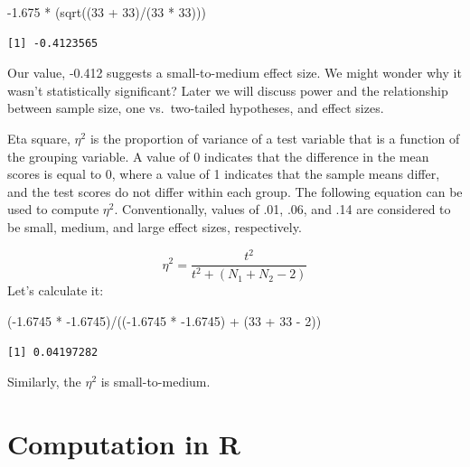 \documentclass[
  11pt,
]{book}
\newenvironment{Shaded}{\begin{snugshade}}{\end{snugshade}}
\newcommand{\DecValTok}[1]{\textcolor[rgb]{0.00,0.00,0.81}{#1}}
\newcommand{\FloatTok}[1]{\textcolor[rgb]{0.00,0.00,0.81}{#1}}
\newcommand{\FunctionTok}[1]{\textcolor[rgb]{0.00,0.00,0.00}{#1}}
\newcommand{\NormalTok}[1]{#1}
\newcommand{\SpecialCharTok}[1]{\textcolor[rgb]{0.00,0.00,0.00}{#1}}
\begin{document}
\begin{Shaded}
\begin{Highlighting}[]
\SpecialCharTok{{-}}\FloatTok{1.675} \SpecialCharTok{*}\NormalTok{ (}\FunctionTok{sqrt}\NormalTok{((}\DecValTok{33} \SpecialCharTok{+} \DecValTok{33}\NormalTok{)}\SpecialCharTok{/}\NormalTok{(}\DecValTok{33} \SpecialCharTok{*} \DecValTok{33}\NormalTok{)))}
\end{Highlighting}
\end{Shaded}

\begin{verbatim}
[1] -0.4123565
\end{verbatim}

Our value, -0.412 suggests a small-to-medium effect size. We might wonder why it wasn't statistically significant? Later we will discuss power and the relationship between sample size, one vs.~two-tailed hypotheses, and effect sizes.

Eta square, \(\eta^2\) is the proportion of variance of a test variable that is a function of the grouping variable. A value of 0 indicates that the difference in the mean scores is equal to 0, where a value of 1 indicates that the sample means differ, and the test scores do not differ within each group. The following equation can be used to compute \(\eta^2\). Conventionally, values of .01, .06, and .14 are considered to be small, medium, and large effect sizes, respectively.

\[\eta^{2} =\frac{t^{2}}{{t^{2}+(N_{1}+N_{2}-2)}}\]
Let's calculate it:

\begin{Shaded}
\begin{Highlighting}[]
\NormalTok{(}\SpecialCharTok{{-}}\FloatTok{1.6745} \SpecialCharTok{*} \SpecialCharTok{{-}}\FloatTok{1.6745}\NormalTok{)}\SpecialCharTok{/}\NormalTok{((}\SpecialCharTok{{-}}\FloatTok{1.6745} \SpecialCharTok{*} \SpecialCharTok{{-}}\FloatTok{1.6745}\NormalTok{) }\SpecialCharTok{+}\NormalTok{ (}\DecValTok{33} \SpecialCharTok{+} \DecValTok{33} \SpecialCharTok{{-}} \DecValTok{2}\NormalTok{))}
\end{Highlighting}
\end{Shaded}

\begin{verbatim}
[1] 0.04197282
\end{verbatim}

Similarly, the \(\eta^2\) is small-to-medium.

\hypertarget{computation-in-r-1}{%
\section{Computation in R}\label{computation-in-r-1}}
\end{document}
